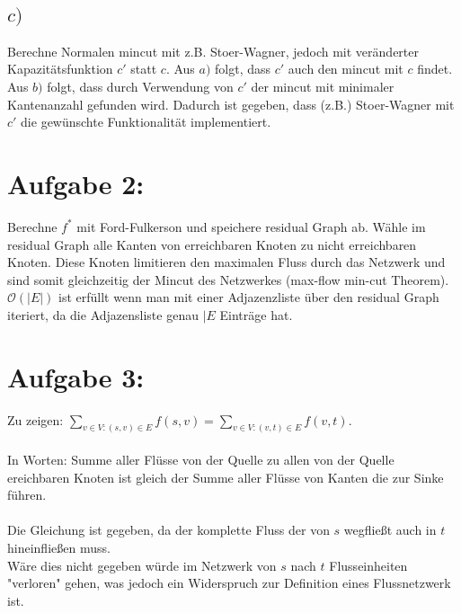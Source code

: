 \documentclass[a4paper]{scrartcl}
\begin{document}
	\subsection*{$c)$}
	Berechne Normalen mincut mit z.B. Stoer-Wagner, jedoch mit veränderter Kapazitätsfunktion $c'$ statt $c$. Aus $a)$ folgt, dass $c'$ auch den mincut mit $c$ findet. Aus $b)$ folgt, dass durch Verwendung von $c'$ der mincut mit minimaler Kantenanzahl gefunden wird. Dadurch ist gegeben, dass (z.B.) Stoer-Wagner mit $c'$ die gewünschte Funktionalität implementiert.

	\newpage
	
	\section*{Aufgabe 2:}
	Berechne $f^*$ mit Ford-Fulkerson und speichere residual Graph ab. Wähle im residual Graph alle Kanten von erreichbaren Knoten zu nicht erreichbaren Knoten. Diese Knoten limitieren den maximalen Fluss durch das Netzwerk und sind somit gleichzeitig der Mincut des Netzwerkes (max-flow min-cut Theorem).\\
	$\mathcal{O}(|E|)$ ist erfüllt wenn man mit einer Adjazenzliste über den residual Graph iteriert, da die Adjazensliste genau $|E$ Einträge hat. 
	
	\section*{Aufgabe 3:}	
	Zu zeigen: $\sum_{v \in V: (s, v) \in E} f(s,v) = \sum_{v \in V: (v, t) \in E} f(v,t)$.\\
	~\\
	In Worten: Summe aller Flüsse von der Quelle zu allen von der Quelle ereichbaren Knoten ist gleich der Summe aller Flüsse von Kanten die zur Sinke führen.\\
	~\\
	Die Gleichung ist gegeben, da der komplette Fluss der von $s$ wegfließt auch in $t$ hineinfließen muss.\\
	Wäre dies nicht gegeben würde im Netzwerk von $s$ nach $t$ Flusseinheiten "verloren" gehen, was jedoch ein Widerspruch zur Definition eines Flussnetzwerk ist.
	
	
	
	
	
	
	
	
	
	
	
	
	
	
	
\end{document}
